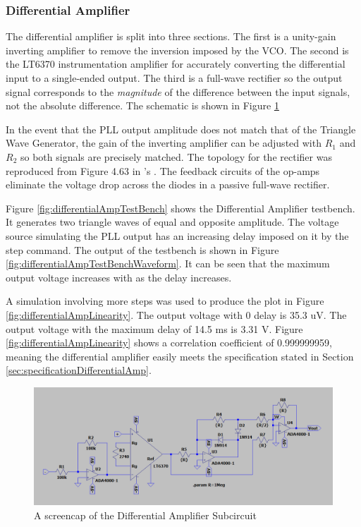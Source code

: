 \subsubsection{Differential Amplifier}
The differential amplifier is split into three sections.
The first is a unity-gain inverting amplifier to remove the inversion imposed by the VCO.
The second is the LT6370 instrumentation amplifier for accurately converting the differential input to a single-ended output.
The third is a full-wave rectifier so the output signal corresponds to the \textit{magnitude} of the difference between the input signals, not the absolute difference.
The schematic is shown in Figure \ref{fig:differentialAmpSchematic}

In the event that the PLL output amplitude does not match that of the Triangle Wave Generator, the gain of the inverting amplifier can be adjusted with $R_{1}$ and $R_{2}$ so both signals are precisely matched.
The topology for the rectifier was reproduced from Figure 4.63 in \citeauthor{rectifierTopology}'s \cite{rectifierTopology}.
The feedback circuits of the op-amps eliminate the voltage drop across the diodes in a passive full-wave rectifier. 

Figure \ref{fig:differentialAmpTestBench} shows the Differential Amplifier testbench. 
It generates two triangle waves of equal and opposite amplitude. 
The voltage source simulating the PLL output has an increasing delay imposed on it by the step command. 
The output of the testbench is shown in Figure \ref{fig:differentialAmpTestBenchWaveform}. 
It can be seen that the maximum output voltage increases with as the delay increases. 

A simulation involving more steps was used to produce the plot in Figure \ref{fig:differentialAmpLinearity}. 
The output voltage with 0 delay is 35.3 uV.
The output voltage with the maximum delay of 14.5 ms is 3.31 V.
Figure \ref{fig:differentialAmpLinearity} shows a correlation coefficient of 0.999999959, meaning the differential amplifier easily meets the specification stated in Section \ref{sec:specificationDifferentialAmp}. 

\begin{figure}[H]
    \centering 
    \includegraphics[width=\textwidth]{../Circuits/Images/DifferentialAmp/Schematic}
    \caption{A screencap of the Differential Amplifier Subcircuit}
    \label{fig:differentialAmpSchematic}
\end{figure}

